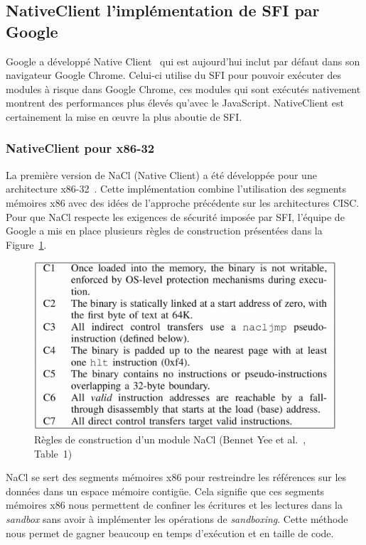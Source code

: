\documentclass[11pt]{sdm}
\begin{document}
\subsection{NativeClient l'implémentation de SFI par Google}

Google a développé Native Client~\cite{Yee:2010:NCS:1629175.1629203} qui est aujourd'hui inclut par défaut dans son navigateur Google Chrome. Celui-ci utilise du SFI pour pouvoir exécuter des modules à risque dans Google Chrome, ces modules qui sont exécutés nativement montrent des performances plus élevés qu'avec le JavaScript.
NativeClient est certainement la mise en œuvre la plus aboutie de SFI. 

\subsubsection{NativeClient pour x86-32}

La première version de NaCl (Native Client) a été développée pour une architecture x86-32~\cite{Yee:2010:NCS:1629175.1629203}. Cette implémentation combine l'utilisation des segments mémoires x86 avec des idées de l'approche précédente sur les architectures CISC. Pour que NaCl respecte les exigences de sécurité imposée par SFI, l'équipe de Google a mis en place plusieurs règles de construction présentées dans la Figure~\ref{nacl_constraints}.

\begin{figure}
\centering
\includegraphics[scale=0.25]{images/nacl_constraints.png}
\caption{Règles de construction d'un module NaCl (Bennet Yee et al.~\cite{Yee:2010:NCS:1629175.1629203}, Table~1)}
\label{nacl_constraints}
\end{figure}

NaCl se sert des segments mémoires x86 pour restreindre les références sur les données dans un espace mémoire contig\"ue. Cela signifie que ces segments mémoires x86 nous permettent de confiner les écritures et les lectures dans la \textit{sandbox} sans avoir à implémenter les opérations de \textit{sandboxing}. Cette méthode nous permet de gagner beaucoup en temps d'exécution et en taille de code.
\end{document}
